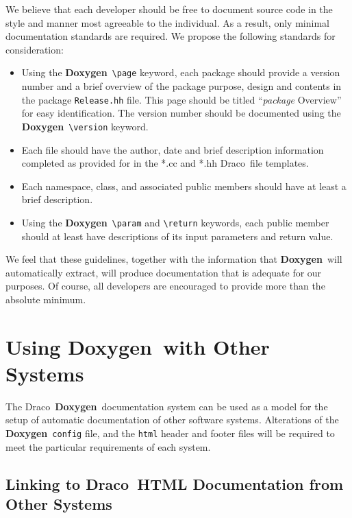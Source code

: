 \documentclass[11pt]{nmemo}
\newcommand{\draco}{{\normalfont\sffamily Draco}}
\newcommand{\doxy}{{\normalfont\bfseries Doxygen}}
\begin{document}
We believe that each developer should be free to document source code
in the style and manner most agreeable to the individual. As a result,
only minimal documentation standards are required.  We propose the
following standards for consideration:

\begin{itemize}
 \item Using the \doxy\
  \verb+\page+ keyword, each package should provide a version number and
  a brief overview of the package purpose, design and contents in the package
  \texttt{Release.hh} file. This page should be titled ``{\em package} Overview''
  for easy identification. The version number should be documented using
  the \doxy\ \verb+\version+ keyword.
 \item Each file should have the author, date and brief description
  information completed as provided for in the *.cc and *.hh \draco\ 
  file templates.
 \item Each namespace, class, and associated public members
  should have at least a brief description.
 \item Using the \doxy\ \verb+\param+ and \verb+\return+ keywords,
  each public member should at least have descriptions of its input
  parameters and return value.
\end{itemize}

We feel that these guidelines, together with the information that
\doxy\ will automatically extract, will produce documentation that is
adequate for our purposes. Of course, all developers are 
encouraged to provide more than the absolute minimum.


\section{Using \doxy\ with Other Systems}

The \draco\ \doxy\ documentation system can be used as a model for
the setup of automatic documentation of other software systems. 
Alterations of 
the \doxy\ \texttt{config} file, and
the \texttt{html} header and footer files will be required to meet
the particular requirements of each system.


\subsection{Linking to \draco\ HTML Documentation from Other Systems}
\end{document}
